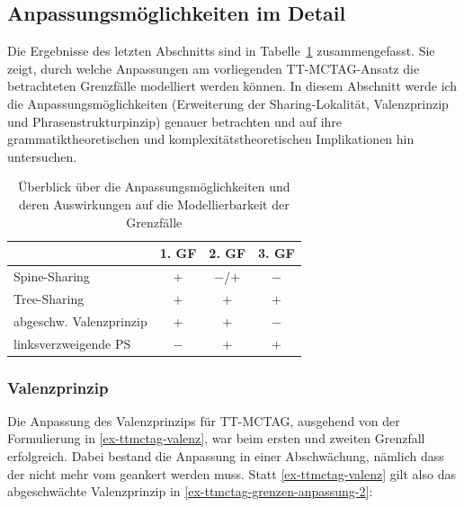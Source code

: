 \subsection{Anpassungsmöglichkeiten im Detail} \label{sec-ttmctag-grenzen-anpassung}

Die Ergebnisse des letzten Abschnitts sind in Tabelle~\ref{tab-ttmctag-grenzen-anpassung-1} zusammengefasst. Sie zeigt, durch welche Anpassungen am vorliegenden TT-MCTAG-Ansatz die betrachteten Grenzfälle modelliert werden können. In diesem Abschnitt werde ich die Anpassungsmöglichkeiten (Erweiterung der Sharing-Lokalität, Valenzprinzip und Phrasenstrukturpinzip) genauer betrachten und auf ihre grammatiktheoretischen und komplexitätstheoretischen Implikationen hin untersuchen. 

\begin{table}[ht]
\begin{center}

\begin{tabular}{l|ccc}
 & 1. GF & 2. GF & 3. GF \\
\hline
Spine-Sharing & + & $-$/+ & $-$ \\ 
Tree-Sharing & + & + & + \\
abgeschw. Valenzprinzip & + & + & $-$ \\
linksverzweigende PS & $-$ & + & +  
\end{tabular}

\end{center}
\caption{\label{tab-ttmctag-grenzen-anpassung-1}Überblick über die Anpassungsmöglichkeiten und deren Auswirkungen auf die Modellierbarkeit der Grenzfälle}
\end{table}



\subsubsection*{Valenzprinzip}

Die Anpassung des Valenzprinzips für TT-MCTAG, ausgehend von der Formulierung in \ref{ex-ttmctag-valenz}, war beim ersten und zweiten Grenzfall erfolgreich. Dabei bestand die Anpassung in einer Abschwächung, nämlich dass der  nicht mehr vom  geankert werden muss. Statt \ref{ex-ttmctag-valenz} gilt also das ab\-ge\-schwäch\-te Valenzprinzip in \ref{ex-ttmctag-grenzen-anpassung-2}:

